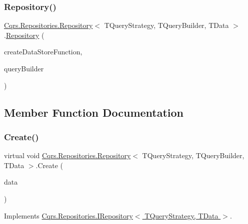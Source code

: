 \subsubsection{\texorpdfstring{Repository()}{Repository()}}
{\footnotesize\ttfamily \hyperlink{classCqrs_1_1Repositories_1_1Repository}{Cqrs.\+Repositories.\+Repository}$<$ T\+Query\+Strategy, T\+Query\+Builder, T\+Data $>$.\hyperlink{classCqrs_1_1Repositories_1_1Repository}{Repository} (\begin{DoxyParamCaption}\item[{Func$<$ \hyperlink{interfaceCqrs_1_1DataStores_1_1IDataStore}{I\+Data\+Store}$<$ T\+Data $>$$>$}]{create\+Data\+Store\+Function,  }\item[{T\+Query\+Builder}]{query\+Builder }\end{DoxyParamCaption})\hspace{0.3cm}{\ttfamily [protected]}}



\subsection{Member Function Documentation}
\mbox{\label{classCqrs_1_1Repositories_1_1Repository_a5d5d78262533aa2ab32eddbab83869bd_a5d5d78262533aa2ab32eddbab83869bd}} 
\subsubsection{\texorpdfstring{Create()}{Create()}\hspace{0.1cm}{\footnotesize\ttfamily [1/2]}}
{\footnotesize\ttfamily virtual void \hyperlink{classCqrs_1_1Repositories_1_1Repository}{Cqrs.\+Repositories.\+Repository}$<$ T\+Query\+Strategy, T\+Query\+Builder, T\+Data $>$.Create (\begin{DoxyParamCaption}\item[{T\+Data}]{data }\end{DoxyParamCaption})\hspace{0.3cm}{\ttfamily [virtual]}}



Implements \hyperlink{interfaceCqrs_1_1Repositories_1_1IRepository_a240c8d094207a22b0c805a5c830d8615_a240c8d094207a22b0c805a5c830d8615}{Cqrs.\+Repositories.\+I\+Repository$<$ T\+Query\+Strategy, T\+Data $>$}.

